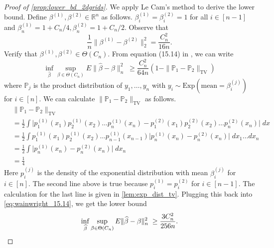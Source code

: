 \documentclass[ejs,noshowframe]{imsart}
\theoremstyle{plain}
\theoremstyle{definition}
\renewcommand{\P}{\mathbb{P}}
\newcommand{\R}{\mathbb{R}}
\newcommand{\E}{E}
\renewcommand{\hat}{\widehat}
\begin{document}
\begin{appendix}
\begin{proof}[Proof of \autoref{prop:lower_bd_2dgrids}]
We apply Le Cam's method to derive the lower bound.
Define $\beta^{(1)}, \beta^{(2)} \in \R^n$ as follows. 
$\beta^{(1)}_i = \beta^{(2)}_i = 1$ for all $i\in[n-1]$ and 
$\beta^{(1)}_n = 1+C_n/4, \beta^{(2)}_n = 1+C_n/2.$
Observe that 
\[
\frac{1}{n}\| \beta^{(1)} - \beta^{(2)} \|_2^2 = \frac{C_n^2}{16n}.
\]
Verify that $\beta^{(1)}, \beta^{(2)} \in \Theta(C_n).$ From equation (15.14) 
in 
\cite{wainwright2019high}, we can write
\begin{equation}
\label{eq:wainwright_15.14}
\inf_{\hat\beta} \sup_{\beta \in \Theta(C_n) } \E \| \hat\beta - \beta \|_n^2 
\;\geq 
\frac{C_n^2}{64n} \left( 1 - \| \P_1 - \P_2 \|_{\mathrm{TV}} \right)
\end{equation}
where $\P_j$ is the product distribution of $y_1,\dots,y_n$ with $y_i \sim 
\mathrm{Exp}(\mathrm{mean} = \beta^{(j)}_i)$ for $i\in[n]$.
We can calculate $\| \P_1 - \P_2 \|_{\mathrm{TV}}$ as follows.
\begin{align*}
&\| \P_1 - \P_2 \|_{\mathrm{TV}} \\
&= \frac{1}{2} \int \bigg| 
	p^{(1)}_1(x_1) p^{(1)}_2(x_2) \dots p^{(1)}_n (x_n) - 
	p^{(2)}_1(x_1) p^{(2)}_2(x_2) \dots p^{(2)}_n (x_n)  \bigg| \; dx \\
&= \frac{1}{2} \int 
	p^{(1)}_1(x_1) p^{(1)}_2(x_2) \dots p^{(1)}_{n-1} (x_{n-1})
	\big| p^{(1)}_n (x_n) - p^{(2)}_n (x_n) \big| \; dx_1 \dots dx_n \\
&= \frac{1}{2} \int \big| p^{(1)}_n (x_n) - p^{(2)}_n (x_n) \big| \; dx_n \\
&= \frac{1}{4}
\end{align*}
Here $p^{(j)}_i$ is the density of the exponential distribution with mean 
$\beta^{(j)}_i$ for $i\in[n].$
The second line above is true because $p^{(1)}_i = p^{(2)}_i$ for $i\in 
[n-1]$. 
The calculation for the last line is given in \autoref{lem:exp_dist_tv}. 
Plugging this back into \eqref{eq:wainwright_15.14}, we get the lower bound
\[
\inf_{\hat\beta} \sup_{\beta \in \Theta(C_n) } \E \| \hat\beta - \beta \|_n^2 
\;\geq 
\frac{3C_n^2}{256n}. \qedhere
\]
\end{proof}


\end{appendix}
\end{document}
